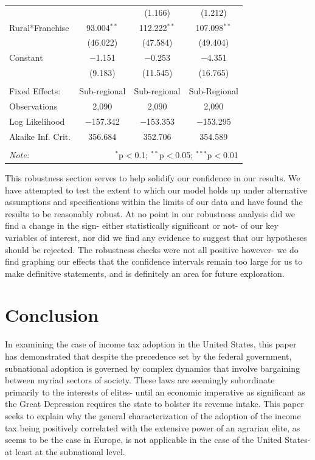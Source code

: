 \documentclass[letter, 12pt]{article}
\begin{document}
\begin{table}[!htbp]
\begin{tabular}{@{\extracolsep{5pt}}lccc}
		&  & (1.166) & (1.212) \\ 
		Rural*Franchise & 93.004$^{**}$ & 112.222$^{**}$ & 107.098$^{**}$ \\ 
		& (46.022) & (47.584) & (49.404) \\ 
		Constant & $-$1.151 & $-$0.253 & $-$4.351 \\ 
		& (9.183) & (11.545) & (16.765) \\ 
		\hline \\[-1.8ex] 
		Fixed Effects: & Sub-regional & Sub-regional & Sub-Regional \\ 
		Observations & 2,090 & 2,090 & 2,090 \\ 
		Log Likelihood & $-$157.342 & $-$153.353 & $-$153.295 \\ 
		Akaike Inf. Crit. & 356.684 & 352.706 & 354.589 \\ 
		\hline 
		\hline \\[-1.8ex] 
		\textit{Note:}  & \multicolumn{3}{r}{$^{*}$p$<$0.1; $^{**}$p$<$0.05; $^{***}$p$<$0.01} \\ 
	\end{tabular} 
\end{table}


This robustness section serves to help solidify our confidence in our results. We have attempted to test the extent to which our model holds up under alternative assumptions and specifications within the limits of our data and have found the results to be reasonably robust. At no point in our robustness analysis did we find a change in the sign- either statistically significant or not- of our key variables of interest, nor did we find any evidence to suggest that our hypotheses should be rejected. The robustness checks were not all positive however- we do find graphing our effects that the confidence intervals remain too large for us to make definitive statements, and is definitely an area for future exploration.

\pagebreak

\section{Conclusion}

In examining the case of income tax adoption in the United States, this paper has demonstrated that despite the precedence set by the federal government, subnational adoption is governed by complex dynamics that involve bargaining between myriad sectors of society. These laws are seemingly subordinate primarily to the interests of elites- until an economic imperative as significant as the Great Depression requires the state to bolster its revenue intake. This paper seeks to explain why the general characterization of the adoption of the income tax being positively correlated with the extensive power of an agrarian elite, as seems to be the case in Europe, is not applicable in the case of the United States- at least at the subnational level. 
\end{document}
